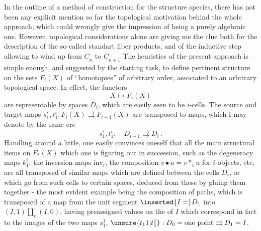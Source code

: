 \quad In the outline of a method of construction for the structure species, there has not been any explicit mention so far  the topological motivation behind the whole approach, which could wrongly give the impression of being a purely algebraic one. However, topological considerations alone are giving me the clue both for the description of the so-called standart fiber products, and of the inductive step allowing to wind up from $\underline{C}_n$ to $\underline{C}_{n+1}$  The heuristics  of the present approach is simple enough, and suggested by the starting task, to define pertinent structure on the  sets $F_i(X)$ of ``homotopies'' of arbitrary order, associated to an arbitrary topological space. In effect, the functors 
\[
X\longmapsto F_i(X)
\]
are representable by spaces $D_i$, which are easily seen to be $i$-cells. The source and target maps $s^i_1,t^i_1:F_i(X)\rightrightarrows F_{i-1}(X)$ are transposed to maps, which I may denote by the same ers
\[
s^i_1,t^i_1:\quad D_{i-1}\rightrightarrows D_i\,.
\]
Handling around a little, one easily convinces oneself that all the main structural items on $F_*(X)$ which one is figuring out in succession, such as the degeneracy maps $k_1^i$, the inversion maps $\mathrm{inv}_i$, the composition $v\bullet u=v*_1u$ for $i$-objects, etc, are all transposed of similar maps which are defined between the cells $D_i$, or which go from such cells to certain spaces, deduced from these by gluing them together - the most evident example  being the composition of paths, which is transposed of a map from the unit segment $\inserted{I=}D_1$ into $(I,1)\amalg_e(I,0)$, having preassigned values on the  of $I$ \handwritten{(}which correspond in fact to the images of the two maps $s_1^1$, $\unsure{t_1 1|t_1^1}:D_0={}\text{one point}\rightrightarrows D_1=I$\handwritten{)}.
